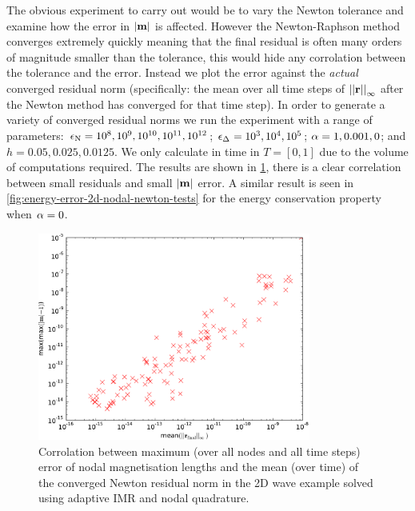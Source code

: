 The obvious experiment to carry out would be to vary the Newton tolerance and examine how the error in $\left|{\boldsymbol{\mathrm{m}}} \right|$ is affected.
However the Newton-Raphson method converges extremely quickly meaning that the final residual is often many orders of magnitude smaller than the tolerance, this would hide any corrolation between the tolerance and the error.
Instead we plot the error against the \emph{actual} converged residual norm (specifically: the mean over all time steps of $\left| \left| \boldsymbol{\mathrm{r}} \right| \right|_\infty$ after the Newton method has converged for that time step).
In order to generate a variety of converged residual norms we run the experiment with a range of parameters: $\epsilon_{\mathrm{N}} = 10^{8}, 10^{9}, 10^{10}, 10^{11}, 10^{12}$; $\epsilon_{\Delta_{}} = 10^{3}, 10^{4}, 10^{5}$; $\alpha = 1, 0.001, 0$; and $h = 0.05, 0.025, 0.0125$.
We only calculate in time in $T = [0, 1]$ due to the volume of computations required.
The results are shown in \cref{fig:ml-error-2d-nodal-newton-tests}, there is a clear correlation between small residuals and small $\left|{\boldsymbol{\mathrm{m}}} \right|$ error.
A similar result is seen in \cref{fig:energy-error-2d-nodal-newton-tests} for the energy conservation property when $\alpha = 0$.

\begin{figure}
  \centering
  \includegraphics[width=0.8\textwidth]
  {plots/2d_wave_solution_m_length_newton_res/maxofmlengtherrormaxesvsmeanminofnewtonresiduals.pdf}
  \caption{Corrolation between maximum (over all nodes and all time steps) error of nodal magnetisation lengths and the mean (over time) of the converged Newton residual norm in the 2D wave example solved using adaptive IMR and nodal quadrature.}
  \label{fig:ml-error-2d-nodal-newton-tests}
\end{figure}


